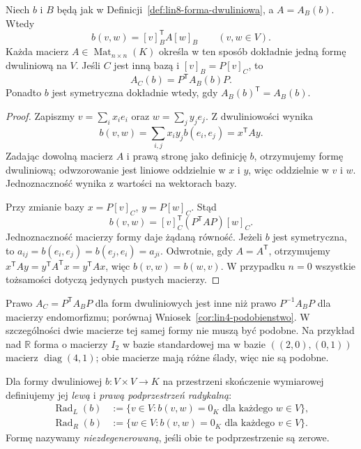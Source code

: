 \begin{twierdzenie}
\label{thm:lin8-macierz-formy}
Niech \(b\) i \(B\) będą
jak w Definicji~\ref{def:lin8-forma-dwuliniowa},
a \(A=A_B(b)\).
Wtedy
\[
 b(v,w)=[v]_B^{\mathsf T}A[w]_B
 \qquad(v,w\in V).
\]
Każda macierz \(A\in
\operatorname{Mat}_{n\times n}(K)\)
określa w ten sposób dokładnie
jedną formę dwuliniową na \(V\).
Jeśli \(C\) jest inną bazą
i \([v]_B=P[v]_C\),
to
\[
 A_C(b)=P^{\mathsf T}A_B(b)P.
\]
Ponadto \(b\) jest symetryczna
dokładnie wtedy, gdy
\(A_B(b)^{\mathsf T}=A_B(b)\).
\end{twierdzenie}
\begin{proof}
Zapiszmy \(v=\sum_i x_ie_i\)
oraz \(w=\sum_j y_je_j\).
Z dwuliniowości wynika
\[
 b(v,w)=\sum_{i,j}x_iy_jb(e_i,e_j)
       =x^{\mathsf T}Ay.
\]
Zadając dowolną macierz \(A\)
i prawą stronę jako definicję \(b\),
otrzymujemy formę dwuliniową;
odwzorowanie jest liniowe oddzielnie
w \(x\) i \(y\), więc oddzielnie
w \(v\) i \(w\).
Jednoznaczność wynika
z wartości na wektorach bazy.

Przy zmianie bazy
\(x=P[v]_C\), \(y=P[w]_C\).
Stąd
\[
 b(v,w)=[v]_C^{\mathsf T}
          (P^{\mathsf T}AP)[w]_C.
\]
Jednoznaczność macierzy formy
daje żądaną równość.
Jeżeli \(b\) jest symetryczna,
to \(a_{ij}=b(e_i,e_j)
=b(e_j,e_i)=a_{ji}\).
Odwrotnie, gdy \(A=A^{\mathsf T}\),
otrzymujemy
\(x^{\mathsf T}Ay
=y^{\mathsf T}A^{\mathsf T}x
=y^{\mathsf T}Ax\),
więc \(b(v,w)=b(w,v)\).
W przypadku \(n=0\)
wszystkie tożsamości dotyczą
jedynych pustych macierzy.
\end{proof}

\begin{uwaga}
\label{rem:lin8-kongruencja}
Prawo \(A_C=P^{\mathsf T}A_BP\)
dla form dwuliniowych jest inne
niż prawo \(P^{-1}A_BP\) dla
macierzy endomorfizmu; porównaj
Wniosek~\ref{cor:lin4-podobienstwo}.
W szczególności dwie macierze tej
samej formy nie muszą być podobne.
Na przykład nad \(\mathbb R\)
forma o macierzy \(I_2\)
w bazie standardowej ma
w bazie \(((2,0),(0,1))\)
macierz \(\operatorname{diag}(4,1)\);
obie macierze mają różne ślady,
więc nie są podobne.
\end{uwaga}

\begin{definicja}
\label{def:lin8-radykal}
Dla formy dwuliniowej
\(b\colon V\times V\to K\)
na przestrzeni skończenie wymiarowej
definiujemy jej \emph{lewą} i
\emph{prawą podprzestrzeń radykalną}:
\[
 \begin{aligned}
 \operatorname{Rad}_L(b)
 &:=\{v\in V:b(v,w)=0_K
                  \text{ dla każdego }w\in V\},\\
 \operatorname{Rad}_R(b)
 &:=\{w\in V:b(v,w)=0_K
                  \text{ dla każdego }v\in V\}.
 \end{aligned}
\]
Formę nazywamy \emph{niezdegenerowaną},
jeśli obie te podprzestrzenie
są zerowe.
\end{definicja}

